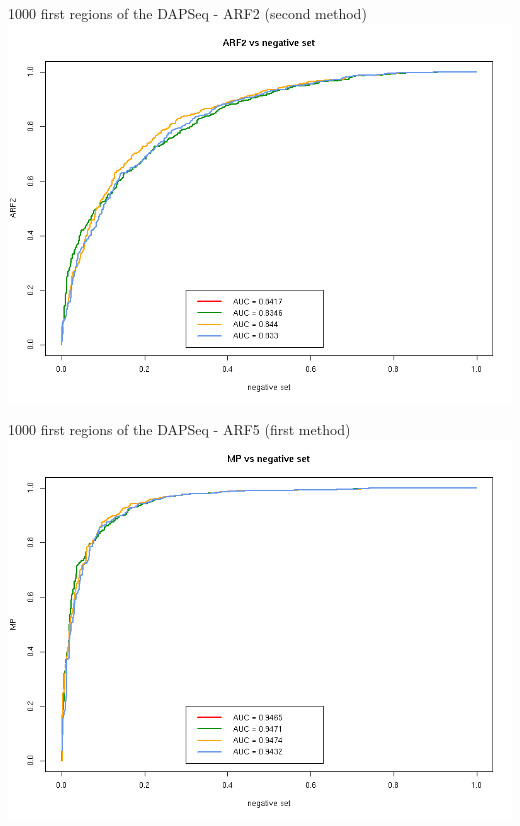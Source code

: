 \documentclass{beamer}
\begin{document}
\begin{frame}{1000 first regions of the DAPSeq - ARF2 (second method)}
  \includegraphics[width=1\textwidth,height=0.8\textheight,center]{ROC_ARF2_negative_set.png}
\end{frame}


\begin{frame}{1000 first regions of the DAPSeq - ARF5 (first method)}
  \includegraphics[width=1\textwidth,height=0.8\textheight,center]{ROC_MP_negative_set_all_regions.png}
\end{frame}
\end{document}
